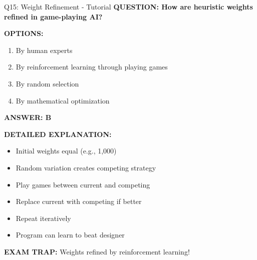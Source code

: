 \documentclass[8pt]{beamer}
\begin{document}
	\begin{frame}{Q15: Weight Refinement - Tutorial}
		\fontsize{6.5}{7.5}\selectfont
		\textbf{QUESTION: How are heuristic weights refined in game-playing AI?}
		
		\vspace{0.1cm}
		\textbf{OPTIONS:}
		\begin{enumerate}
			\item By human experts
			\item By reinforcement learning through playing games
			\item By random selection
			\item By mathematical optimization
		\end{enumerate}
		
		\vspace{0.1cm}
		\textcolor{myblue}{\textbf{ANSWER: B}}
		
		\vspace{0.1cm}
		\textbf{DETAILED EXPLANATION:}
		\begin{itemize}
			\item Initial weights equal (e.g., 1,000)
			\item Random variation creates competing strategy
			\item Play games between current and competing
			\item Replace current with competing if better
			\item Repeat iteratively
			\item Program can learn to beat designer
		\end{itemize}
		
		\vspace{0.1cm}
		\textcolor{myred}{\textbf{EXAM TRAP:}} Weights refined by \textcolor{myblue}{reinforcement learning}!
	\end{frame}
	
\end{document}
